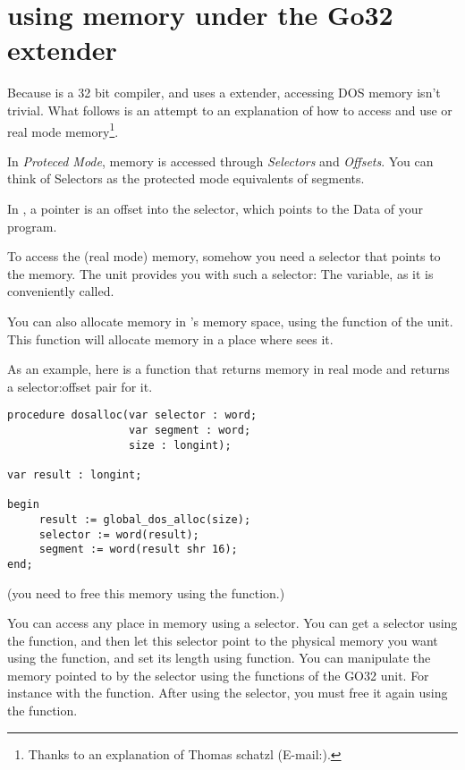 \documentclass{report}
\begin{document}
\section{using \dos memory under the Go32 extender}
\label{se:AccessingDosMemory}

Because \fpc is a 32 bit compiler, and uses a \dos extender, accessing DOS
memory isn't trivial. What follows is an attempt to an explanation of how to
access and use \dos or real mode memory\footnote{Thanks to an explanation of
Thomas schatzl (E-mail:).}.

In {\em Proteced Mode}, memory is accessed through {\em Selectors} and
{\em Offsets}. You can think of Selectors as the protected mode
equivalents of segments.

In \fpc, a pointer is an offset into the  selector, which points to
the Data of your program.

To access the (real mode) \dos memory, somehow you need a selector that
points to the \dos memory.
The  unit provides you with such a selector: The
 variable, as it is conveniently called.

You can also allocate memory in \dos's memory space, using the
 function of the  unit.
This function will allocate memory in a place where \dos sees it.

As an example, here is a function that returns memory in real mode \dos and
returns a selector:offset pair for it.
\begin{verbatim}
procedure dosalloc(var selector : word;
                   var segment : word;
                   size : longint);

var result : longint;

begin
     result := global_dos_alloc(size);
     selector := word(result);
     segment := word(result shr 16);
end;
\end{verbatim}
(you need to free this memory using the  function.)

You can access any place in memory using a selector. You can get a selector
using the  function, and then let this selector
point to the physical memory you want using the
 function, and set its length using
 function.
You can manipulate the memory pointed to by the selector using the functions
of the GO32 unit. For instance with the  function.
After using the selector, you must free it again using the
 function.
\end{document}

